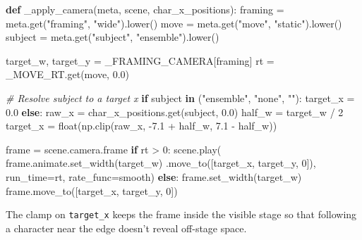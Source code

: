\documentclass[
  11pt,
]{book}
\newenvironment{Shaded}{}{}
\newcommand{\BuiltInTok}[1]{\textcolor[rgb]{0.00,0.50,0.00}{#1}}
\newcommand{\CommentTok}[1]{\textcolor[rgb]{0.38,0.63,0.69}{\textit{#1}}}
\newcommand{\ControlFlowTok}[1]{\textcolor[rgb]{0.00,0.44,0.13}{\textbf{#1}}}
\newcommand{\DecValTok}[1]{\textcolor[rgb]{0.25,0.63,0.44}{#1}}
\newcommand{\FloatTok}[1]{\textcolor[rgb]{0.25,0.63,0.44}{#1}}
\newcommand{\KeywordTok}[1]{\textcolor[rgb]{0.00,0.44,0.13}{\textbf{#1}}}
\newcommand{\NormalTok}[1]{#1}
\newcommand{\OperatorTok}[1]{\textcolor[rgb]{0.40,0.40,0.40}{#1}}
\newcommand{\StringTok}[1]{\textcolor[rgb]{0.25,0.44,0.63}{#1}}
\begin{document}
\begin{Shaded}
\begin{Highlighting}[]
\KeywordTok{def}\NormalTok{ \_apply\_camera(meta, scene, char\_x\_positions):}
\NormalTok{    framing }\OperatorTok{=}\NormalTok{ meta.get(}\StringTok{"framing"}\NormalTok{, }\StringTok{"wide"}\NormalTok{).lower()}
\NormalTok{    move    }\OperatorTok{=}\NormalTok{ meta.get(}\StringTok{"move"}\NormalTok{,    }\StringTok{"static"}\NormalTok{).lower()}
\NormalTok{    subject }\OperatorTok{=}\NormalTok{ meta.get(}\StringTok{"subject"}\NormalTok{, }\StringTok{"ensemble"}\NormalTok{).lower()}

\NormalTok{    target\_w, target\_y }\OperatorTok{=}\NormalTok{ \_FRAMING\_CAMERA[framing]}
\NormalTok{    rt                 }\OperatorTok{=}\NormalTok{ \_MOVE\_RT.get(move, }\FloatTok{0.0}\NormalTok{)}

    \CommentTok{\# Resolve subject to a target x}
    \ControlFlowTok{if}\NormalTok{ subject }\KeywordTok{in}\NormalTok{ (}\StringTok{"ensemble"}\NormalTok{, }\StringTok{"none"}\NormalTok{, }\StringTok{""}\NormalTok{):}
\NormalTok{        target\_x }\OperatorTok{=} \FloatTok{0.0}
    \ControlFlowTok{else}\NormalTok{:}
\NormalTok{        raw\_x  }\OperatorTok{=}\NormalTok{ char\_x\_positions.get(subject, }\FloatTok{0.0}\NormalTok{)}
\NormalTok{        half\_w }\OperatorTok{=}\NormalTok{ target\_w }\OperatorTok{/} \DecValTok{2}
\NormalTok{        target\_x }\OperatorTok{=} \BuiltInTok{float}\NormalTok{(np.clip(raw\_x,}
                                 \OperatorTok{{-}}\FloatTok{7.1} \OperatorTok{+}\NormalTok{ half\_w, }\FloatTok{7.1} \OperatorTok{{-}}\NormalTok{ half\_w))}

\NormalTok{    frame }\OperatorTok{=}\NormalTok{ scene.camera.frame}
    \ControlFlowTok{if}\NormalTok{ rt }\OperatorTok{\textgreater{}} \DecValTok{0}\NormalTok{:}
\NormalTok{        scene.play(}
\NormalTok{            frame.animate.set\_width(target\_w)}
\NormalTok{                  .move\_to([target\_x, target\_y, }\DecValTok{0}\NormalTok{]),}
\NormalTok{            run\_time}\OperatorTok{=}\NormalTok{rt, rate\_func}\OperatorTok{=}\NormalTok{smooth)}
    \ControlFlowTok{else}\NormalTok{:}
\NormalTok{        frame.set\_width(target\_w)}
\NormalTok{        frame.move\_to([target\_x, target\_y, }\DecValTok{0}\NormalTok{])}
\end{Highlighting}
\end{Shaded}

The clamp on \texttt{target\_x} keeps the frame inside the visible stage
so that following a character near the edge doesn't reveal off-stage
space.
\end{document}

